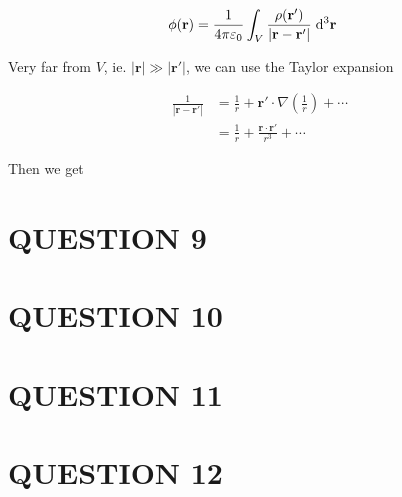 \documentclass[a4paper]{article}
\begin{document}
\begin{align*}
\phi(\mathbf{r}) & = \frac{1}{4 \pi \varepsilon_{0}} \int_{V} \frac{\rho(\mathbf{r}')}{| \mathbf{r} - \mathbf{r}' |} \; \mathrm{d}^{3} \mathbf{r}
\end{align*}

Very far from $ V $, ie. $ | \mathbf{r} | \gg | \mathbf{r}' | $, we can use the Taylor expansion

\begin{align*}
\frac{1}{| \mathbf{r} - \mathbf{r}' |} & =  \frac{1}{r} + \mathbf{r}' \cdot \nabla \left(  \frac{1}{r} \right) + \cdots \\
& = \frac{1}{r} + \frac{\mathbf{r} \cdot \mathbf{r}'}{r^{3}} + \cdots
\end{align*}

Then we get 


\section{QUESTION 9}
\section{QUESTION 10}
\section{QUESTION 11}
\section{QUESTION 12}
\end{document}
